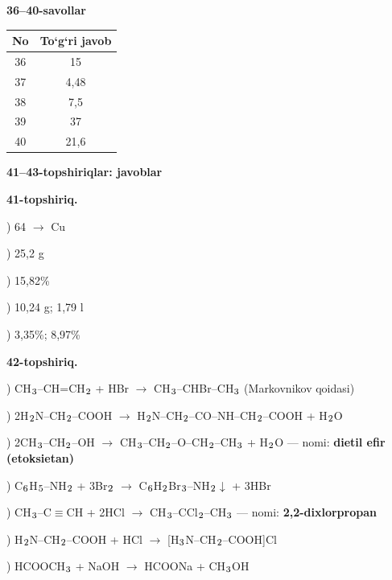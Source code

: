 \documentclass[11pt,a4paper]{article}
\renewcommand{\textsubscript}[1]{\ensuremath{_{\text{\fontsize{8}{8}\selectfont #1}}}}
\begin{document}
\noindent\textbf{36--40-savollar}\par\smallskip
\noindent\begin{tabular}{|c|c|}\hline \textbf{No} & \textbf{To`g`ri javob}\\\hline
36 & 15\\\hline
37 & 4,48\\\hline
38 & 7,5\\\hline
39 & 37\\\hline
40 & 21,6\\\hline
\end{tabular}\par\medskip
\noindent\textbf{41--43-topshiriqlar: javoblar}\par\smallskip
\noindent\textbf{41-topshiriq.}\par
{}) 64 $\to$ Cu\par
{}) 25,2 g\par
{}) 15,82\%\par
{}) 10,24 g; 1,79 l\par
{}) 3,35\%; 8,97\%\par
\noindent\textbf{42-topshiriq.}\par
{}) CH\textsubscript{3}--CH=CH\textsubscript{2} + HBr $\to$ CH\textsubscript{3}--CHBr--CH\textsubscript{3} (Markovnikov qoidasi)\par
{}) 2H\textsubscript{2}N--CH\textsubscript{2}--COOH $\to$ H\textsubscript{2}N--CH\textsubscript{2}--CO--NH--CH\textsubscript{2}--COOH + H\textsubscript{2}O\par
{}) 2CH\textsubscript{3}--CH\textsubscript{2}--OH $\to$ CH\textsubscript{3}--CH\textsubscript{2}--O--CH\textsubscript{2}--CH\textsubscript{3} + H\textsubscript{2}O --- nomi: \textbf{dietil efir (etoksietan)}\par
{}) C\textsubscript{6}H\textsubscript{5}--NH\textsubscript{2} + 3Br\textsubscript{2} $\to$ C\textsubscript{6}H\textsubscript{2}Br\textsubscript{3}--NH\textsubscript{2}$\downarrow$ + 3HBr\par
{}) CH\textsubscript{3}--C$\equiv$CH + 2HCl $\to$ CH\textsubscript{3}--CCl\textsubscript{2}--CH\textsubscript{3} --- nomi: \textbf{2,2-dixlorpropan}\par
{}) H\textsubscript{2}N--CH\textsubscript{2}--COOH + HCl $\to$ [H\textsubscript{3}N--CH\textsubscript{2}--COOH]Cl\par
{}) HCOOCH\textsubscript{3} + NaOH $\to$ HCOONa + CH\textsubscript{3}OH\par
\end{document}
